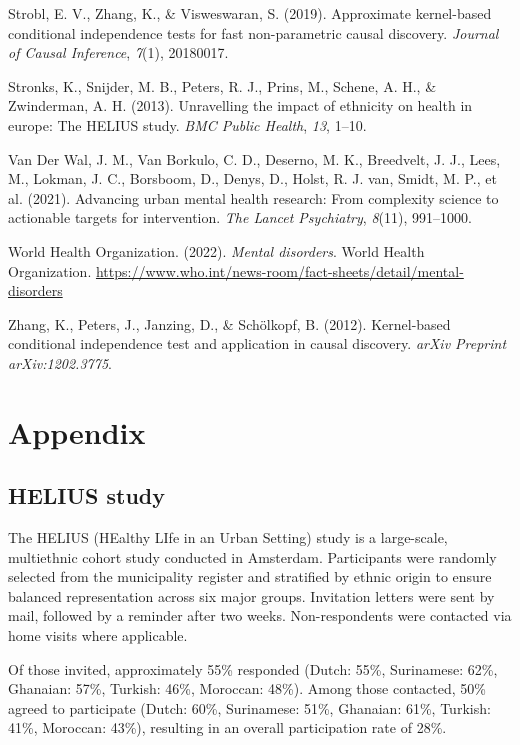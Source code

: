 \documentclass[
]{article}
\newlength{\cslhangindent}
\newenvironment{CSLReferences}[2] %
 {\begin{list}{}{%
  \setlength{\itemindent}{0pt}
  \setlength{\leftmargin}{0pt}
  \setlength{\parsep}{0pt}
  \ifodd #1
   \setlength{\leftmargin}{\cslhangindent}
   \setlength{\itemindent}{-1\cslhangindent}
  \fi
  \setlength{\itemsep}{#2\baselineskip}}}
 {\end{list}}
\begin{document}
\begin{CSLReferences}{1}{0}
Strobl, E. V., Zhang, K., \& Visweswaran, S. (2019). Approximate
kernel-based conditional independence tests for fast non-parametric
causal discovery. \emph{Journal of Causal Inference}, \emph{7}(1),
20180017.

Stronks, K., Snijder, M. B., Peters, R. J., Prins, M., Schene, A. H., \&
Zwinderman, A. H. (2013). Unravelling the impact of ethnicity on health
in europe: The HELIUS study. \emph{BMC Public Health}, \emph{13}, 1--10.

Van Der Wal, J. M., Van Borkulo, C. D., Deserno, M. K., Breedvelt, J.
J., Lees, M., Lokman, J. C., Borsboom, D., Denys, D., Holst, R. J. van,
Smidt, M. P., et al. (2021). Advancing urban mental health research:
From complexity science to actionable targets for intervention.
\emph{The Lancet Psychiatry}, \emph{8}(11), 991--1000.

World Health Organization. (2022). \emph{Mental disorders}. World Health
Organization.
\url{https://www.who.int/news-room/fact-sheets/detail/mental-disorders}

Zhang, K., Peters, J., Janzing, D., \& Schölkopf, B. (2012).
Kernel-based conditional independence test and application in causal
discovery. \emph{arXiv Preprint arXiv:1202.3775}.

\end{CSLReferences}

\section{Appendix}\label{sec-appendix}

\subsection{HELIUS study}\label{helius-study}

The HELIUS (HEalthy LIfe in an Urban Setting) study is a large-scale,
multiethnic cohort study conducted in Amsterdam. Participants were
randomly selected from the municipality register and stratified by
ethnic origin to ensure balanced representation across six major groups.
Invitation letters were sent by mail, followed by a reminder after two
weeks. Non-respondents were contacted via home visits where applicable.

Of those invited, approximately 55\% responded (Dutch: 55\%, Surinamese:
62\%, Ghanaian: 57\%, Turkish: 46\%, Moroccan: 48\%). Among those
contacted, 50\% agreed to participate (Dutch: 60\%, Surinamese: 51\%,
Ghanaian: 61\%, Turkish: 41\%, Moroccan: 43\%), resulting in an overall
participation rate of 28\%.
\end{document}
